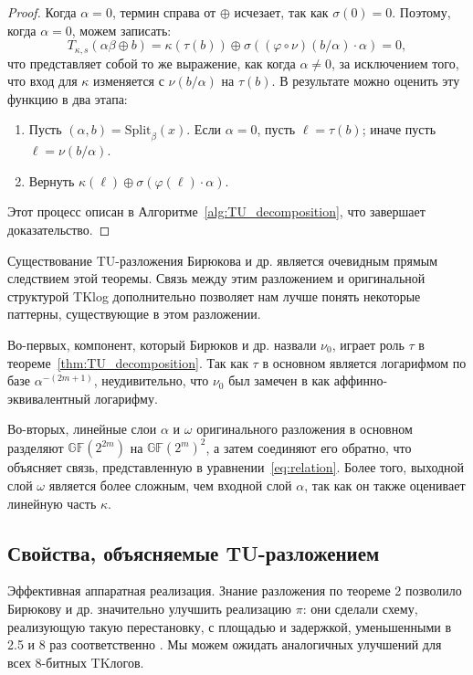 \begin{proof}
Когда \(\alpha = 0\), термин справа от \(\oplus\) исчезает, так как \(\sigma(0) = 0\). Поэтому, когда \(\alpha = 0\), можем записать:
\[
T_{\kappa, s}(\alpha \beta \oplus b) = \kappa(\tau(b)) \oplus \sigma((\varphi \circ \nu)(b/\alpha) \cdot \alpha) = 0,
\]
что представляет собой то же выражение, как когда \(\alpha \neq 0\), за исключением того, что вход для \(\kappa\) изменяется с \(\nu(b/\alpha)\) на \(\tau(b)\). В результате можно оценить эту функцию в два этапа:

\begin{enumerate}
  \item Пусть \((\alpha, b) = \mathrm{Split}_{\beta}(x)\). Если \(\alpha = 0\), пусть \(\ell = \tau(b)\); иначе пусть \(\ell = \nu(b/\alpha)\).
  \item Вернуть \(\kappa(\ell) \oplus \sigma(\varphi(\ell) \cdot \alpha)\).
\end{enumerate}

Этот процесс описан в Алгоритме~\ref{alg:TU_decomposition}, что завершает доказательство.
\end{proof}

Существование TU-разложения Бирюкова и др. является очевидным прямым следствием этой теоремы. Связь между этим разложением и оригинальной структурой TKlog дополнительно позволяет нам лучше понять некоторые паттерны, существующие в этом разложении.

Во-первых, компонент, который Бирюков и др. назвали \(\nu_0\), играет роль \(\tau\) в теореме~\ref{thm:TU_decomposition}. Так как \(\tau\) в основном является логарифмом по базе \(\alpha^{-(2m+1)}\), неудивительно, что \(\nu_0\) был замечен в \cite{PU16} как аффинно-эквивалентный логарифму.

Во-вторых, линейные слои \(\alpha\) и \(\omega\) оригинального разложения в основном разделяют \(\mathbb{GF}(2^{2m})\) на \(\mathbb{GF}(2^m)^2\), а затем соединяют его обратно, что объясняет связь, представленную в уравнении~\ref{eq:relation}. Более того, выходной слой \(\omega\) является более сложным, чем входной слой \(\alpha\), так как он также оценивает линейную часть \(\kappa\).

\subsection{Свойства, объясняемые TU-разложением}

Эффективная аппаратная реализация. Знание разложения по теореме 2 позволило Бирюкову и др. значительно улучшить реализацию \(\pi\): они сделали схему, реализующую такую перестановку, с площадью и задержкой, уменьшенными в 2.5 и 8 раз соответственно \cite{BPU16b, Table 8}. Мы можем ожидать аналогичных улучшений для всех 8-битных TKлогов.


